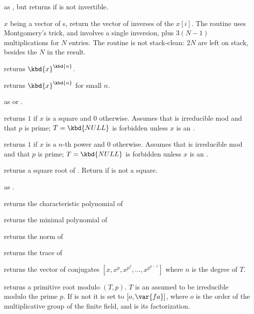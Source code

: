  as , but returns
 if  is not invertible.


 $x$ being a vector of s,
return the vector of inverses of the $x[i]$. The routine uses Montgomery's
trick, and involves a single inversion, plus $3(N-1)$ multiplications for
$N$ entries. The routine is not stack-clean: $2N$  are left on
stack, besides the $N$ in the result.

 returns $\kbd{x}^\kbd{n}$.

 returns $\kbd{x}^\kbd{n}$
for small $n$.

 as
 or .

 returns $1$ if $x$ is a square
and $0$ otherwise. Assumes that  is irreducible mod  and that
$p$ is prime; $T = \kbd{NULL}$ is forbidden unless $x$ is an .

 returns $1$ if $x$
is a $n$-th power and $0$ otherwise. Assumes that  is irreducible mod
 and that $p$ is prime; $T = \kbd{NULL}$ is forbidden unless $x$ is an
.

 returns a square root of .
Return  if  is not a square.

as .

 returns the characteristic
polynomial of 

 returns the minimal polynomial
of 

 returns the norm of 

 returns the trace of 

 returns the vector of conjugates
$[x,x^p,x^{p^2},\ldots,x^{p^{n-1}}]$ where $n$ is the degree of $T$.

 returns a primitive root modulo
$(T,p)$. $T$ is an  assumed to be irreducible modulo the prime
$p$. If  is not  it is set to $[o,\var{fa}]$, where $o$ is
the order of the multiplicative group of the finite field, and  is
its factorization.

